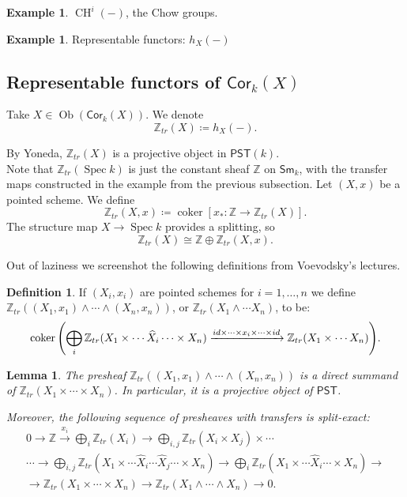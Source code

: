 \documentclass[leqno, openany]{memoir}
\newtheorem{lem}[thm]{Lemma}
\theoremstyle{definition}
\newtheorem{defn}[thm]{Definition}
\newtheorem{exm}[thm]{Example}
\theoremstyle{remark}
\theoremstyle{plain}
\theoremstyle{definition}
\theoremstyle{remark}
\newcommand{\Z}{\mathbb{Z}}
\newcommand{\ms}[1]{\mathsf{#1}}
\newcommand{\wh}[1]{\widehat{#1}}
\newcommand{\Sm}{\mathsf{Sm}}
\newcommand{\Cor}{\mathsf{Cor}}
\DeclareMathOperator{\Spec}{Spec}
\DeclareMathOperator{\CH}{CH}
\DeclareMathOperator{\Ob}{Ob}
\DeclareMathOperator{\coker}{coker}
\begin{document}
\begin{exm} $\CH^i(-)$, the Chow groups.  \end{exm}

\begin{exm} Representable functors: $h_X(-)$ \end{exm} 

\subsection{Representable functors of $\Cor_k(X)$} Take $X\in \Ob(\Cor_k(X))$.
We denote \[ \Z_{tr}(X)\coloneqq h_X(-).  \]

By Yoneda, $\Z_{tr}(X)$ is a projective object in $\ms{PST}(k)$. \\ 

Note that $\Z_{tr}(\Spec k)$ is just the constant sheaf $\Z$ on $\Sm_k$, with
the transfer maps constructed in the example from the previous subsection.  Let
$(X, x)$ be a pointed scheme.  We define \[ \Z_{tr}(X, x)\coloneqq \coker
    [x_*:\Z\rightarrow \Z_{tr}(X)].  \] The structure map $X\rightarrow\Spec k$
    provides a splitting, so \[ \Z_{tr}(X)\cong \Z\oplus \Z_{tr}(X, x).  \]

Out of laziness we screenshot the following definitions from Voevodsky's
lectures.

\begin{defn} If $(X_i, x_i)$ are pointed schemes for $i = 1, \ldots, n$ we
    define $\Z_{tr}((X_1, x_1) \wedge \cdots \wedge (X_n, x_n))$, or
    $\Z_{tr}(X_1 \wedge \cdots X_n)$, to be: \[ \coker \qty(\bigoplus_i
    \Z_{tr}(X_1 \times \cdots \wh{X}_i \cdots \times X_n) \xrightarrow{id
\times \cdots \times x_i \times \cdots \times id} \Z_{tr}(X_1 \times \cdots
X_n)). \] \end{defn}

\begin{lem} The presheaf $\Z_{tr}((X_1, x_1) \wedge \cdots \wedge (X_n, x_n))$
    is a direct summand of $\Z_{tr}(X_1 \times \cdots \times X_n)$. In
    particular, it is a projective object of $\ms{PST}$.

    Moreover, the following sequence of presheaves with transfers is
    split-exact: \begin{align*} 0 \to \Z \xrightarrow{x_i} \bigoplus_i
        \Z_{tr}(X_i) \to \bigoplus_{i,j} \Z_{tr}(X_i \times X_j) \times \cdots
        \\ \cdots \to \bigoplus_{i,j} \Z_{tr}(X_1 \times \cdots \wh{X}_i \cdots
        \wh{X}_j \cdots \times X_n) \to \bigoplus_i \Z_{tr}(X_1 \times \cdots
        \wh{X}_i \cdots \times X_n) \to \\ \to \Z_{tr}(X_1 \times \cdots \times
    X_n) \to \Z_{tr}(X_1 \wedge \cdots \wedge X_n) \to 0.  \end{align*}
\end{lem}
\end{document}
